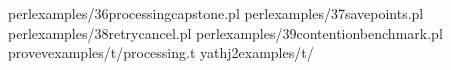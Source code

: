 perlexamples/36\PGZhy{}processing\PGZhy{}capstone.pl
perlexamples/37\PGZhy{}savepoints.pl
perlexamples/38\PGZhy{}retry\PGZhy{}cancel.pl
perlexamples/39\PGZhy{}contention\PGZhy{}benchmark.pl
prove\PGZhy{}vexamples/t/processing.t
yath\PGZhy{}j2examples/t/
